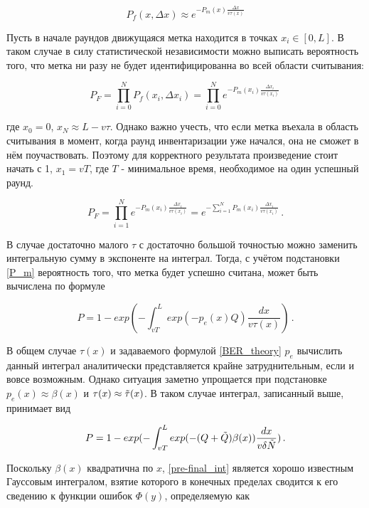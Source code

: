\documentclass[12pt]{article}
\theoremstyle{definition}
\begin{document}
\begin{equation}
    P_f(x,\Delta x) \approx e^{-P_m(x)\frac{\Delta x}{v\tau(x)}}
\end{equation}

Пусть в начале раундов движущаяся метка находится в точках $x_i\in[0,L]$. В таком случае в силу статистической независимости можно выписать вероятность того, что метка ни разу не будет идентифицированна во всей области считывания:

\begin{equation}
    P_F=\prod_{i=0}^N P_f(x_i,\Delta x_i) = \prod_{i=0}^N e^{-P_m(x_i)\frac{\Delta x_i}{v\tau(x_i)}}\,
\end{equation}

где $x_0 = 0$, $x_N\approx L-v\tau$. Однако важно учесть, что если метка въехала в область считывания в момент, когда раунд инвентаризации уже начался, она не сможет в нём поучаствовать. Поэтому для корректного результата произведение стоит начать с 1, $x_1=vT$, где $T$ - минимальное время, необходимое на один успешный раунд. 

\begin{equation}
    P_F = \prod_{i=1}^N e^{-P_m(x_i)\frac{\Delta x_i}{v\tau(x_i)}} = e^{-\sum_{i=1}^N P_m(x_i)\frac{\Delta x_i}{v\tau(x_i)}}\,.
\end{equation}

В случае достаточно малого $\tau$ с достаточно большой точностью можно заменить интегральную сумму в экспоненте на интеграл. Тогда, с учётом подстановки \eqref{P_m} вероятность того, что метка будет успешно считана, может быть вычислена по формуле 

\begin{equation}
    P = 1 - exp(-\int_{vT}^L exp(-p_e(x)Q)\frac{dx}{v\tau(x)})\,.
\end{equation}

В общем случае $\tau(x)$ и задаваемого формулой \eqref{BER_theory} $p_e$ вычислить данный интеграл аналитически представляется крайне затруднительным, если и вовсе возможным. Однако ситуация заметно упрощается при подстановке $p_e(x)\approx\beta(x)$ и $\tau(x)\approx\Tilde{\tau}(x)$. В таком случае интеграл, записанный выше, принимает вид

\begin{equation}
\label{pre-final_int}
    P = 1 - exp(-\int_{vT}^L exp(-(Q+\Tilde{Q})\beta(x))\frac{dx}{v\delta\Tilde{N}})\,.
\end{equation}

Поскольку $\beta(x)$ квадратична по $x$, \eqref{pre-final_int} является хорошо известным Гауссовым интегралом, взятие которого в конечных пределах сводится к его сведению к функции ошибок $\Phi(y)$, определяемую как
\end{document}
